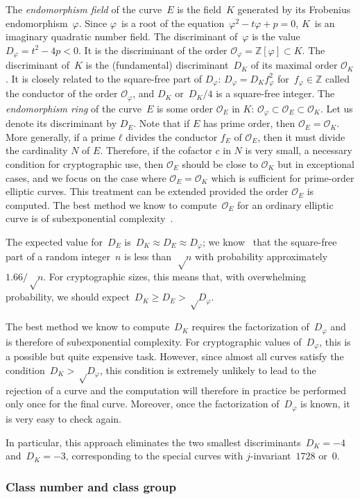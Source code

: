 \documentclass[twocolumn,letterpaper,10pt]{article}
\let\ro\mathcal
\begin{document}
The \emph{endomorphism field} of the curve~$E$
is the field~$K$ generated by its Frobenius endomorphism~$φ$.
Since $φ$~is a root of the equation~$φ^2 - t φ + p = 0$,
$K$~is an imaginary quadratic number field.
The discriminant of~$φ$ is the value~$D_φ = t^2 - 4 p < 0$.
It is the discriminant of the order $\ro O_φ = ℤ[φ] \subset K$.
The discriminant of~$K$ is the (fundamental) discriminant~$D_K$ of its
maximal order $\ro O_K$.
It is closely related to the square-free part of $D_φ$:
$D_φ = D_K f_φ^2$ for~$f_φ ∈ ℤ$
called the conductor of the order $\ro O_φ$,
and $D_K$ or~$D_K/4$ is a square-free integer.
The \emph{endomorphism ring} of the curve~$E$ is some order $\ro O_E$ in $K$:
$\ro O_φ \subset \ro O_E \subset \ro O_K$.
Let us denote its discriminant by $D_E$.
Note that if $E$ has prime order, then $\ro O_E = \ro O_K$.
More generally, if a prime $ℓ$ divides the conductor $f_E$ of $\ro O_E$,
then it must divide the cardinality $N$ of $E$.
Therefore, if the cofactor $c$ in $N$ is very small, a necessary condition for
cryptographic use, then $\ro O_E$ should be close to $\ro O_K$ but
in exceptional cases, and we focus on the case where $\ro O_E = \ro O_K$
which is sufficient for prime-order elliptic curves.
This treatment can be extended provided the order $\ro O_E$ is computed.
The best method we know to compute~$\ro O_E$ for an ordinary elliptic curve
is of subexponential complexity~\cite{jmc2012bisson}.

The expected value for~$D_E$ is~$D_K ≈ D_E ≈ D_φ$;
we know~\cite{jis2014cdkd} that the square-free part of
a random integer~$n$ is less than~$√n$
with probability approximately~$1.66/√n$.
For cryptographic sizes, this means that,
with overwhelming probability, we should expect~$D_K \geq D_E > √{D_φ}$.

The best method we know to compute~$D_K$ requires the
factorization of~$D_φ$ and is therefore of subexponential complexity.
For cryptographic values of~$D_φ$, this is a possible but
quite expensive task.
However, since almost all curves satisfy the condition~$D_K > √{D_φ}$,
this condition is extremely unlikely to lead to the rejection of a curve
and the computation will therefore in practice be performed
only once for the final curve.
Moreover, once the factorization of~$D_φ$ is known,
it is very easy to check again.

In particular, this approach eliminates
the two smallest discriminants~$D_K = -4$ and~$D_K = -3$,
corresponding to the special curves with $j$-invariant~$1728$ or~$0$.

\subsubsection{Class number and class group}
\label{sss:class-group}
\end{document}
